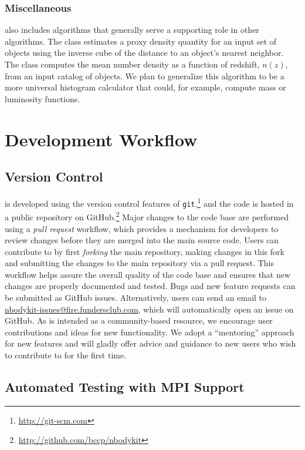 \subsubsection{Miscellaneous}

\nbkit{} also includes algorithms that generally serve a supporting role
in other algorithms. The  class estimates a proxy density
quantity for an input set of objects using the inverse cube of the distance to
an object's nearest neighbor. The  class computes the
mean number density as a function of redshift, $n(z)$, from an input catalog of
objects. We plan to generalize this algorithm to be a more universal histogram
calculator that could, for example, compute mass or luminosity functions.

\section{Development Workflow}
\label{sec:dev-approach}

\subsection{Version Control}

\nbkit{} is developed using the version control features of
\texttt{git},\footnote{\url{http://git-scm.com}} and the code is hosted
in a public repository on
GitHub.\footnote{\url{http://github.com/bccp/nbodykit}}
Major changes to the code base are
performed using a \textit{pull request} workflow, which provides a
mechanism for developers to review changes before they are merged into the
main source code. Users can contribute to \nbkit{} by first \textit{forking}
the main repository, making changes in this fork and submitting the
changes to the main repository via a pull request. This workflow helps
assure the overall quality of the code base and ensures that new changes
are properly documented and tested. Bugs and new feature requests can be
submitted as GitHub issues. Alternatively, users can send an email
to \url{nbodykit-issues@fire.fundersclub.com}, which will automatically
open an issue on GitHub. As \nbkit{} is intended as a community-based
resource, we encourage user contributions and ideas for new functionality.
We adopt a ``mentoring'' approach for new features and will gladly offer
advice and guidance to new users who wish to contribute to \nbkit{} for the
first time.

\subsection{Automated Testing with MPI Support}

